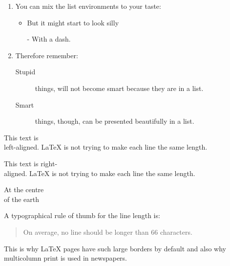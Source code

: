 \documentclass[a4paper, 11pt]{article}
\begin{document}


\flushleft
\begin{enumerate}
  \item You can mix the list environments to your taste:

  \begin{itemize}
    \item But it might start to look silly
    \item[-]With a dash.
  \end{itemize}
  \item Therefore remember:

  \begin{description}
    \item[Stupid] things, will not become smart because they are in a list.
    \item[Smart] things, though, can be presented beautifully in a list.
  \end{description}
\end{enumerate}


\begin{flushleft}
  This text is\\ left-aligned. \LaTeX{} is not trying to make each line the same length.
\end{flushleft}

\begin{flushright}
  This text is right-\\aligned. \LaTeX{} is not trying to make each line the same length.
\end{flushright}

\begin{center}
  At the centre\\of the earth
\end{center}


A typographical rule of thumb for the line length is:
\begin{quote}
  On average, no line should be longer than 66 characters.
\end{quote}
This is why \LaTeX{} pages have such large borders by default and
also why multicolumn print is used in newspapers.
\\
\end{document}
